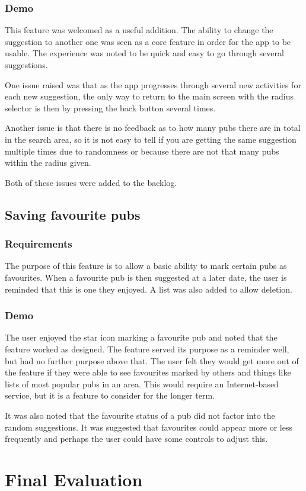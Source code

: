 \documentclass{report}
\begin{document}
\subsection{Demo}

This feature was welcomed as a useful addition. The ability to change
the suggestion to another one was seen as a core feature in order
for the app to be usable. The experience was noted to be quick and
easy to go through several suggestions.

One issue raised was that as the app progresses through several new
activities for each new suggestion, the only way to return to the main
screen with the radius selector is then by pressing the back button
several times.

Another issue is that there is no feedback as to how many pubs there are
in total in the search area, so it is not easy to tell if you are
getting the same suggestion multiple times due to randomness or
because there are not that many pubs within the radius given.

Both of these issues were added to the backlog.

\section{Saving favourite pubs}
\subsection{Requirements}

The purpose of this feature is to allow a basic ability to mark certain
pubs as favourites. When a favourite pub is then suggested at a later
date, the user is reminded that this is one they enjoyed. A list
was also added to allow deletion.

\subsection{Demo}

The user enjoyed the star icon marking a favourite pub and noted
that the feature worked as designed. The feature served its purpose
as a reminder well, but had no further purpose above that. The user
felt they would get more out of the feature if they were able to see
favourites marked by others and things like lists of most popular
pubs in an area. This would require an Internet-based service, but
it is a feature to consider for the longer term.

It was also noted that the favourite status of a pub did not factor
into the random suggestions. It was suggested that favourites could
appear more or less frequently and perhaps the user could have some
controls to adjust this.

\chapter{Final Evaluation}
\label{chapter:evaluation}
\end{document}
